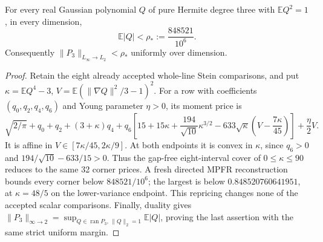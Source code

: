 \begin{proposition}
\label{prop:cubic-rho-star}
For every real Gaussian polynomial $Q$ of pure Hermite degree three with
$\mathbb E Q^2=1$, in every dimension,
\[
 \mathbb E|Q|<\rho_*:=\frac{848521}{10^6}.
\]
Consequently $\|P_3\|_{L_\infty\to L_2}<\rho_*$ uniformly over dimension.
\end{proposition}
\begin{proof}
Retain the eight already accepted whole-line Stein comparisons, and put
$\kappa=\mathbb EQ^4-3$, $V=\mathbb E(\|\nabla Q\|^2/3-1)^2$.
For a row with coefficients $(q_0,q_2,q_4,q_6)$ and Young parameter
$\eta>0$, its moment price is
\[
 \sqrt{2/\pi}+q_0+q_2+(3+\kappa)q_4+
 q_6\left[15+15\kappa+\frac{194}{\sqrt{10}}\kappa^{3/2}
       -633\sqrt\kappa\left(V-\frac{7\kappa}{45}\right)\right]
 +\frac\eta2 V.
\]
It is affine in $V\in[7\kappa/45,2\kappa/9]$. At both endpoints it
is convex in $\kappa$, since $q_6>0$ and
$194/\sqrt{10}-633/15>0$. Thus the gap-free eight-interval cover of
$0\le\kappa\le90$ reduces to the same 32 corner prices. A fresh directed
MPFR reconstruction bounds every corner below $848521/10^6$; the largest
is below $0.848520760641951$, at $\kappa=48/5$ on the lower-variance
endpoint. This repricing changes none of the accepted scalar comparisons.
Finally, duality gives
$\|P_3\|_{\infty\to2}=\sup_{Q\in\operatorname{ran}P_3,\,\|Q\|_2=1}
\mathbb E|Q|$, proving the last assertion with the same strict uniform
margin.
\end{proof}
